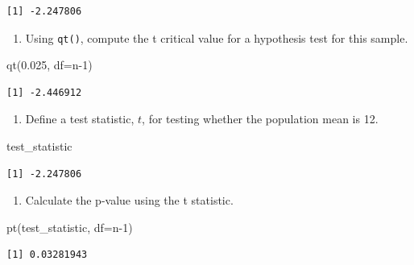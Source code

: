 \documentclass[
  letterpaper,
  DIV=11,
  numbers=noendperiod]{scrreprt}
\newenvironment{Shaded}{\begin{snugshade}}{\end{snugshade}}
\newcommand{\AttributeTok}[1]{\textcolor[rgb]{0.40,0.45,0.13}{#1}}
\newcommand{\DecValTok}[1]{\textcolor[rgb]{0.68,0.00,0.00}{#1}}
\newcommand{\FloatTok}[1]{\textcolor[rgb]{0.68,0.00,0.00}{#1}}
\newcommand{\FunctionTok}[1]{\textcolor[rgb]{0.28,0.35,0.67}{#1}}
\newcommand{\NormalTok}[1]{\textcolor[rgb]{0.00,0.23,0.31}{#1}}
\providecommand{\tightlist}{%
  \setlength{\itemsep}{0pt}\setlength{\parskip}{0pt}}\usepackage{longtable,booktabs,array}
\begin{document}
\begin{verbatim}
[1] -2.247806
\end{verbatim}

\begin{enumerate}
\def\labelenumi{\arabic{enumi}.}
\setcounter{enumi}{1}
\tightlist
\item
  Using \texttt{qt()}, compute the t critical value for a hypothesis
  test for this sample.
\end{enumerate}

\begin{Shaded}
\begin{Highlighting}[]
\FunctionTok{qt}\NormalTok{(}\FloatTok{0.025}\NormalTok{, }\AttributeTok{df=}\NormalTok{n}\DecValTok{{-}1}\NormalTok{)}
\end{Highlighting}
\end{Shaded}

\begin{verbatim}
[1] -2.446912
\end{verbatim}

\begin{enumerate}
\def\labelenumi{\arabic{enumi}.}
\setcounter{enumi}{2}
\tightlist
\item
  Define a test statistic, \(t\), for testing whether the population
  mean is 12.
\end{enumerate}

\begin{Shaded}
\begin{Highlighting}[]
\NormalTok{test\_statistic}
\end{Highlighting}
\end{Shaded}

\begin{verbatim}
[1] -2.247806
\end{verbatim}

\begin{enumerate}
\def\labelenumi{\arabic{enumi}.}
\setcounter{enumi}{3}
\tightlist
\item
  Calculate the p-value using the t statistic.
\end{enumerate}

\begin{Shaded}
\begin{Highlighting}[]
\FunctionTok{pt}\NormalTok{(test\_statistic, }\AttributeTok{df=}\NormalTok{n}\DecValTok{{-}1}\NormalTok{)}
\end{Highlighting}
\end{Shaded}

\begin{verbatim}
[1] 0.03281943
\end{verbatim}
\end{document}
